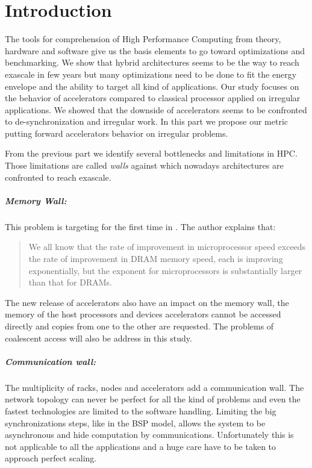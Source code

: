 
\chapter*{Introduction}

The tools for comprehension of High Performance Computing from theory, hardware and software give us the basis elements to go toward optimizations and benchmarking. 
We show that hybrid architectures seems to be the way to reach exascale in few years but many optimizations need to be done to fit the energy envelope and the ability to target all kind of applications. 
Our study focuses on the behavior of accelerators compared to classical processor applied on irregular applications. 
We showed that the downside of accelerators seems to be confronted to de-synchronization and irregular work. 
In this part we propose our metric putting forward accelerators behavior on irregular problems. 

From the previous part we identify several bottlenecks and limitations in HPC. 
Those limitations are called \textit{walls} against which nowadays architectures are confronted to reach exascale. 

\paragraph{Memory Wall: }
This problem is targeting for the first time in \cite{wulf1995hitting}.
The author explains that:
\begin{quotation} We all know that the rate of improvement in microprocessor speed exceeds the rate of improvement in DRAM memory speed, each is improving exponentially, but the exponent for microprocessors is substantially larger than that for DRAMs.
\end{quotation}
The new release of accelerators also have an impact on the memory wall, the memory of the host processors and devices accelerators cannot be accessed directly and copies from one to the other are requested.
The problems of coalescent access will also be address in this study.

\paragraph{Communication wall: } 
The multiplicity of racks, nodes and accelerators add a communication wall. 
The network topology can never be perfect for all the kind of problems and even the fastest technologies are limited to the software handling. 
Limiting the big synchronizations steps, like in the BSP model, allows the system to be asynchronous and hide computation by communications. 
Unfortunately this is not applicable to all the applications and a huge care have to be taken to approach perfect scaling. 

